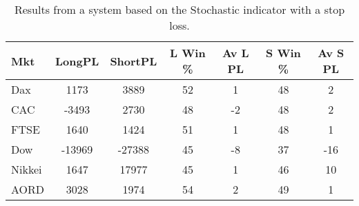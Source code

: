 \begin{table}[ht]
\centering
\caption[Results from a system based on the Stochastic indicator with a stop loss]{Results from a system based on the Stochastic indicator with a stop loss.} 
\label{tab:stoch_results_sloss}
\begin{tabular}{lcccccc}
  \toprule Mkt & LongPL & ShortPL & L Win \% & Av L PL & S Win \% & Av S PL \\ 
  \midrule Dax & 1173 & 3889 & 52 & 1 & 48 & 2 \\ 
  CAC & -3493 & 2730 & 48 & -2 & 48 & 2 \\ 
  FTSE & 1640 & 1424 & 51 & 1 & 48 & 1 \\ 
  Dow & -13969 & -27388 & 45 & -8 & 37 & -16 \\ 
  Nikkei & 1647 & 17977 & 45 & 1 & 46 & 10 \\ 
  AORD & 3028 & 1974 & 54 & 2 & 49 & 1 \\ 
   \bottomrule \end{tabular}
\end{table}
